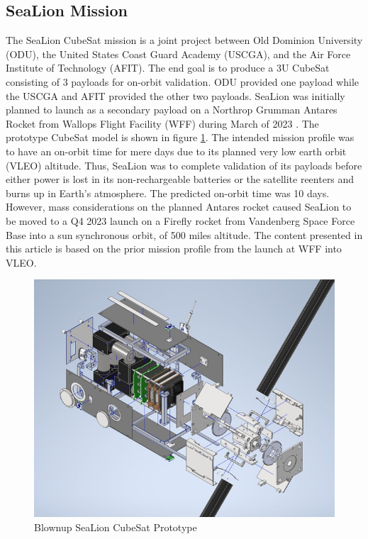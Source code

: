\documentclass[journal,article,submit,pdftex,moreauthors]{Definitions/mdpi}
\begin{document}
\subsection{SeaLion Mission}
The SeaLion CubeSat mission is a joint project between Old Dominion University (ODU), the United States Coast Guard Academy (USCGA), and the Air Force Institute of Technology (AFIT).  The end goal is to produce a 3U CubeSat consisting of 3 payloads for on-orbit validation.  ODU provided one payload while the USCGA and AFIT provided the other two payloads.  SeaLion was initially planned to launch as a secondary payload on a Northrop Grumman Antares Rocket from Wallops Flight Facility (WFF) during March of 2023 \cite{sealion_cdr}.  The prototype CubeSat model is shown in figure \ref{fig:cubesat_blowup}.  The intended mission profile was to have an on-orbit time for mere days due to its planned very low earth orbit (VLEO) altitude.  Thus, SeaLion was to complete validation of its payloads before either power is lost in its non-rechargeable batteries or the satellite reenters and burns up in Earth's atmosphere.  The predicted on-orbit time was 10 days.  However, mass considerations on the planned Antares rocket caused SeaLion to be moved to a Q4 2023 launch on a Firefly rocket from Vandenberg Space Force Base into a sun synchronous orbit, of 500 miles altitude.  The content presented in this article is based on the prior mission profile from the launch at WFF into VLEO.

\begin{figure}[H]
    \includegraphics[width=10.5 cm]{assets/cubesat_blownup.png}
    \caption{Blownup SeaLion CubeSat Prototype}
	\label{fig:cubesat_blowup}
    \end{figure}
	\noindent   
\unskip
\end{document}
